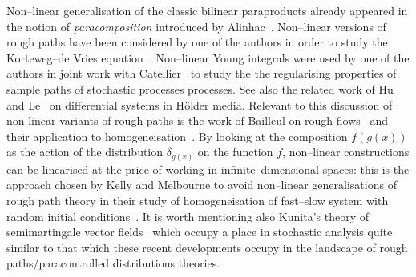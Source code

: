 \documentclass[11pt,reqno]{amsart}
\newcommand{\tmtextit}[1]{{\itshape{#1}}}
\begin{document}
Non--linear generalisation of the classic bilinear paraproducts already
appeared in the notion of \tmtextit{paracomposition} introduced by
Alinhac~{\cite{bony_microlocal_1991}}. Non--linear versions of rough paths
have been considered by one of the authors in order to study the Korteweg--de
Vries equation~{\cite{gubinelli_rough_2012}}. Non--linear Young integrals were
used by one of the authors in joint work with
Catellier~{\cite{catellier_averaging_2016}} to study the the regularising
properties of sample paths of stochastic processes processes. See also the
related work of Hu and Le~{\cite{hu_nonlinear_2014}} on differential systems
in H{\"o}lder media. Relevant to this discussion of non-linear variants of
rough paths is the work of Bailleul on rough
flows~{\cite{bailleul_flows_2015}} and their application to
homogeneisation~{\cite{bailleul_rough_2016}}. By looking at the composition $f
(g (x))$ as the action of the distribution $\delta_{g (x)}$ on the function
$f$, non--linear constructions can be linearised at the price of working in
infinite--dimensional spaces: this is the approach chosen by Kelly and
Melbourne to avoid non--linear generalisations of rough path theory in their
study of homogeneisation of fast--slow system with random initial
conditions~{\cite{kelly_deterministic_2014}}. It is worth mentioning also
Kunita's theory of semimartingale vector
fields~{\cite{kunita_stochastic_1984}} which occupy a place in stochastic
analysis quite similar to that which these recent developments occupy in the
landscape of rough paths/paracontrolled distributions theories.
\end{document}
